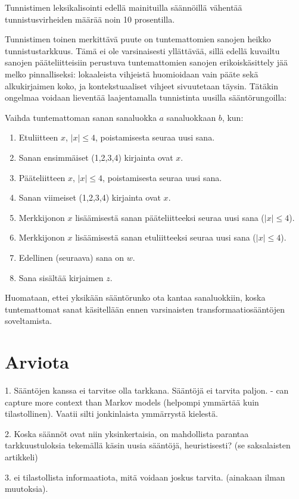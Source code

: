 \documentclass[utf8,bachelor,manualbib]{gradu3}
\begin{document}
Tunnistimen leksikalisointi edellä mainituilla säännöillä vähentää tunnistusvirheiden määrää noin 10 prosentilla. \citep{brill1994}

Tunnistimen toinen merkittävä puute on tuntemattomien sanojen heikko tunnistustarkkuus. Tämä ei ole varsinaisesti yllättävää, sillä edellä kuvailtu sanojen pääteliitteisiin perustuva tuntemattomien sanojen erikoiskäsittely jää melko pinnalliseksi: lokaaleista vihjeistä huomioidaan vain pääte sekä alkukirjaimen koko, ja kontekstuaaliset vihjeet sivuutetaan täysin. Tätäkin ongelmaa voidaan lieventää laajentamalla tunnistinta uusilla sääntörungoilla: 

Vaihda tuntemattoman sanan sanaluokka $a$ sanaluokkaan $b$, kun:

\begin{enumerate}
\item Etuliitteen $x$, $|x| \leq 4$, poistamisesta seuraa uusi sana.
\item Sanan ensimmäiset (1,2,3,4) kirjainta ovat $x$. 
\item Pääteliitteen $x$, $|x| \leq 4$, poistamisesta seuraa uusi sana.
\item Sanan viimeiset (1,2,3,4) kirjainta ovat $x$. 
\item Merkkijonon $x$ lisäämisestä sanan pääteliitteeksi seuraa uusi sana ($|x| \leq 4$).
\item Merkkijonon $x$ lisäämisestä sanan etuliitteeksi seuraa uusi sana ($|x| \leq 4$).
\item Edellinen (seuraava) sana on $w$.
\item Sana sisältää kirjaimen $z$.
\end{enumerate}

Huomataan, ettei yksikään sääntörunko ota kantaa sanaluokkiin, koska tuntemattomat sanat käsitellään ennen varsinaisten transformaatiosääntöjen soveltamista. \citep{brill1994}

\section{Arviota}
1. Sääntöjen kanssa ei tarvitse olla tarkkana. Sääntöjä ei tarvita paljon. - can capture more context than Markov models (helpompi ymmärtää kuin tilastollinen). Vaatii silti jonkinlaista ymmärrystä kielestä.

2. Koska säännöt ovat niin yksinkertaisia, on mahdollista parantaa tarkkuustuloksia tekemällä käsin uusia sääntöjä, heuristisesti? (se saksalaisten artikkeli)

3. ei tilastollista informaatiota, mitä voidaan joskus tarvita. (ainakaan ilman muutoksia).
\end{document}
